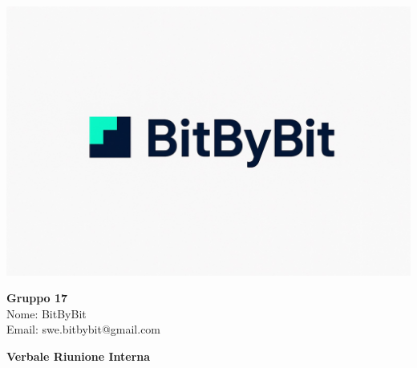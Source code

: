 \documentclass[a4paper,12pt]{article}
\begin{document}
\begin{center}
    \begin{minipage}{0.25\textwidth}
        \centering
        \includegraphics[width=\linewidth]{logo.png}
    \end{minipage}
    \hfill
    \begin{minipage}{0.7\textwidth}
        \raggedright
        {\LARGE \textbf{Gruppo 17}}\\[0.3cm]
        {\large
        Nome: BitByBit\\
        Email: swe.bitbybit@gmail.com
        }
    \end{minipage}
\end{center}

\vspace{1.5cm}

\begin{center}
    {\LARGE \textbf{Verbale Riunione Interna}}
\end{center}

\vspace*{\fill} %
\end{document}
